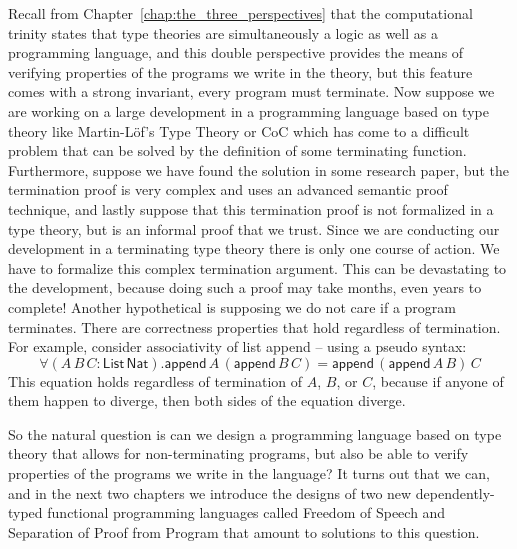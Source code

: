 \documentclass[phd,appendix,dedicationpage,ackpage,epigraphpage,figures]{uithesis}
\begin{document}
Recall from Chapter~\ref{chap:the_three_perspectives} that the
computational trinity states that type
theories are simultaneously a logic as well as a programming language,
and this double perspective provides the means of verifying properties
of the programs we write in the theory, but this feature comes with a
strong invariant, every program must terminate.  Now suppose we are
working on a large development in a programming language based on type
theory like Martin-L\"of's Type Theory or CoC which has come to a
difficult problem that can be solved by the definition of some
terminating function.  Furthermore, suppose we have found the solution
in some research paper, but the termination proof is very complex and
uses an advanced semantic proof technique, and lastly suppose that
this termination proof is not formalized in a type theory, but is an
informal proof that we trust.  Since we are conducting our development
in a terminating type theory there is only one course of action.  We
have to formalize this complex termination argument. This can be
devastating to the development, because doing such a proof may take
months, even years to complete!  Another hypothetical is supposing we
do not care if a program terminates.  There are correctness properties
that hold regardless of termination.  For example, consider
associativity of list append -- using a pseudo syntax:
\[ \forall (A\,B\,C :
\mathsf{List}\,\mathsf{Nat}).\mathsf{append}\,A\,(\mathsf{append}\,B\,C)
= \mathsf{append}\,(\mathsf{append}\,A\,B)\,C \] This equation holds
regardless of termination of $A$, $B$, or $C$, because if anyone of
them happen to diverge, then both sides of the equation diverge.  

So the natural question is can we design a programming language based
on type theory that allows for non-terminating programs, but also be
able to verify properties of the programs we write in the language?
It turns out that we can, and in the next two chapters we introduce
the designs of two new dependently-typed functional programming
languages called Freedom of Speech and Separation of Proof from
Program that amount to solutions to this question.
\end{document}
